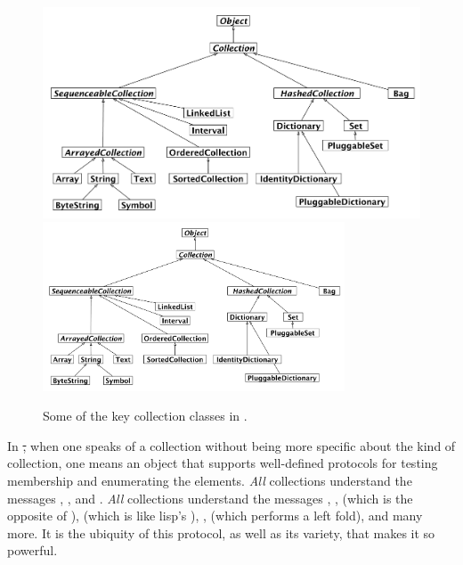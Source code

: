 \documentclass[a4paper,10pt,twoside]{book}
\begin{document}
\begin{figure}
\begin{center}
\ifluluelse
	{\includegraphics[width=\textwidth]{CollectionHierarchy}}
	{\includegraphics[width=0.8\textwidth]{CollectionHierarchy}}
\caption{Some of the key collection classes in \squeak.}
\label{fig:CollClassesTree}
\end{center}
\end{figure}

In \st, when one speaks of a collection without being more specific about the kind of collection, one means an object that supports well-defined protocols for testing membership and enumerating the elements.
\emph{All} collections understand the  messages \mbox{,} , and \mbox{.}
\emph{All} collections understand the  messages , ,  (which is the opposite of ),  (which is like lisp's ), ,  (which performs a left fold), and many more.
It is the ubiquity of this protocol, as well as its variety, that makes it so powerful.
\end{document}
